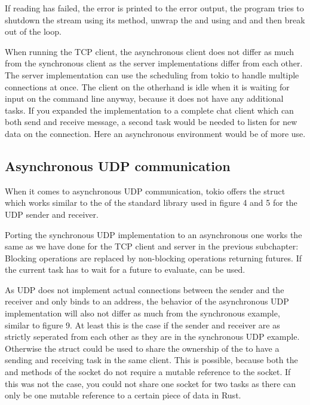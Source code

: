 If reading has failed, the error is printed to the error output, the program tries to shutdown the stream using its
 method, unwrap the  and  using  and  and then break out
of the loop.

When running the TCP client, the asynchronous client does not differ as much from the synchronous client as the server
implementations differ from each other. The server implementation can use the scheduling from tokio to handle multiple
connections at once. The client on the otherhand is idle when it is waiting for input on the command line anyway,
because it does not have any additional tasks. If you expanded the implementation to a complete chat client which can
both send and receive message, a second task would be needed to listen for new data on the connection. Here an
asynchronous environment would be of more use.

\subsection{Asynchronous UDP communication}
When it comes to asynchronous UDP communication, tokio offers the struct  which works
similar to the  of the standard library used in figure 4 and 5 for the UDP sender and receiver.

Porting the synchronous UDP implementation to an asynchronous one works the same as we have done for the TCP client and
server in the previous subchapter: Blocking operations are replaced by non-blocking operations returning futures. If
the current task has to wait for a future to evaluate,  can be used.

As UDP does not implement actual connections between the sender and the receiver and only binds to an address, the
behavior of the asynchronous UDP implementation will also not differ as much from the synchronous example, similar to
figure 9. At least this is the case if the sender and receiver are as strictly seperated from each other as they are in
the synchronous UDP example. Otherwise the struct  could be used to share the ownership of the
 to have a sending and receiving task in the same client. This is possible, because both the
 and  methods of the socket do not require a mutable reference to the socket. If this was
not the case, you could not share one socket for two tasks as there can only be one mutable reference to a certain
piece of data in Rust.

